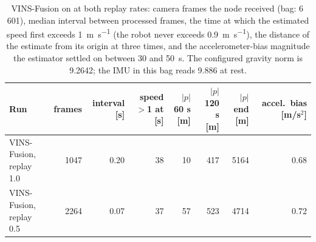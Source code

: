 \begin{table}[htbp]
\centering
\small
\caption[Realv6: the two VINS-Fusion runs.]{VINS-Fusion on  at both replay rates: camera frames the node received (bag: 6\,601), median interval between processed frames, the time at which the estimated speed first exceeds \SI{1}{\metre\per\second} (the robot never exceeds \SI{0.9}{\metre\per\second}), the distance of the estimate from its origin at three times, and the accelerometer-bias magnitude the estimator settled on between 30 and \SI{50}{\second}. The configured gravity norm is \num{9.2642}; the IMU in this bag reads \num{9.886} at rest.}
\label{tab:realv6-vins}
\scriptsize\setlength{\tabcolsep}{3pt}
\begin{tabular}{lrrrrrrr}
\toprule
Run & frames & interval [s] & speed $>$1 at [s] & $|p|$ 60 s [m] & $|p|$ 120 s [m] & $|p|$ end [m] & accel.\ bias [m/s$^2$] \\
\midrule
VINS-Fusion, replay 1.0 & 1047 & 0.20 & 38 & 10 & 417 & 5164 & 0.68 \\
VINS-Fusion, replay 0.5 & 2264 & 0.07 & 37 & 57 & 523 & 4714 & 0.72 \\
\bottomrule
\end{tabular}
\end{table}
